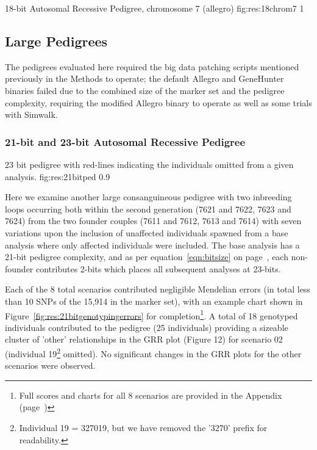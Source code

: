 	{18-bit Autosomal Recessive Pedigree, chromosome 7 (allegro)}
	{fig:res:18chrom7}
	{1}


\subsection{Large Pedigrees}

The pedigrees evaluated here required the big data patching scripts mentioned previously in the Methods to operate; the default Allegro and GeneHunter binaries failed due to the combined size of the marker set and the pedigree complexity, requiring the modified Allegro binary to operate as well as some trials with Simwalk.

\subsubsection*{21-bit and 23-bit Autosomal Recessive Pedigree}

	{23 bit pedigree with red-lines indicating the individuals omitted from a given analysis.}
	{fig:res:21bitped}
	{0.9}

Here we examine another large consanguineous pedigree with two inbreeding loops occurring both within the second generation (7621 and 7622, 7623 and 7624) from the two founder couples (7611 and 7612, 7613 and 7614) with seven variations upon the inclusion of unaffected individuals spawned from a base analysis where only affected individuals were included. The base analysis has a 21-bit pedigree complexity, and as per equation~\ref{eqn:bitsize} on page~\pageref{eqn:bitsize}, each non-founder contributes 2-bits which places all subsequent analyses at 23-bits.

Each of the 8 total scenarios contributed negligible Mendelian errors (in total less than 10 SNPs of the 15,914 in the marker set), with an example chart shown in Figure~\ref{fig:res:21bitgenotypingerrors} for completion\footnote{ \label{footnote:scores} Full scores and charts for all 8 scenarios are provided in the Appendix (page~\pageref{ref:app:21bitscores})}. A total of 18 genotyped individuals contributed to the pedigree (25 individuals) providing a sizeable cluster of 'other' relationships in the GRR plot (Figure 12) for scenario 02 (individual 19\footnote{Individual 19 = 327019, but we have removed the '3270' prefix for readability.} omitted). No significant changes in the GRR plots for the other scenarios were observed.

